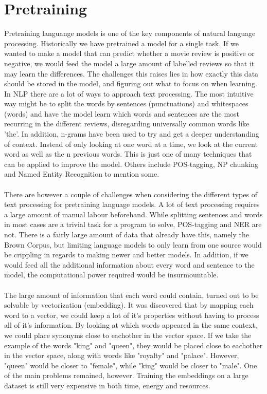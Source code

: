 \documentclass{report}
\begin{document}
\section{Pretraining}
Pretraining languange models is one of the key components of natural language processing. Historically we have pretrained a model for a single task. If we wanted to make a model that can predict whether a movie review is positive or negative, we would feed the model a large amount of labelled reviews so that it may learn the differences. The challenges this raises lies in how exactly this data should be stored in the model, and figuring out what to focus on when learning. In NLP there are a lot of ways to approach text processing. The most intuitive way might be to split the words by sentences (punctuations) and whitespaces (words) and have the model learn which words and sentences are the most recurring in the different reviews, disregarding universally common words like 'the'. In addition, n-grams have been used to try and get a deeper understanding of context. Instead of only looking at one word at a time, we look at the current word as well as the n previous words. This is just one of many techniques that can be applied to improve the model. Others include POS-tagging, NP chunking and Named Entity Recognition to mention some.\\\\
\noindent
There are however a couple of challenges when considering the different types of text processing for pretraining language models. A lot of text processing requires a large amount of manual labour beforehand. While splitting sentences and words in most cases are a trivial task for a program to solve, POS-tagging and NER are not. There is a fairly large amount of data that already have this, namely the Brown Corpus, but limiting language models to only learn from one source would be crippling in regards to making newer and better models. In addition, if we would feed all the additional information about every word and sentence to the model, the computational power required would be insurmountable. 
\\\\
\noindent
The large amount of information that each word could contain, turned out to be solvable by vectorization (embedding). It was discovered that by mapping each word to a vector, we could keep a lot of it's properties without having to process all of it's information. By looking at which words appeared in the same context, we could place synonyms close to eachother in the vector space. If we take the example of the words "king" and "queen", they would be placed close to eachother in the vector space, along with words like "royalty" and "palace". However, "queen" would be closer to "female", while "king" would be closer to "male". One of the main problems remained, however. Training the embeddings on a large dataset is still very expensive in both time, energy and resources.
\end{document}
